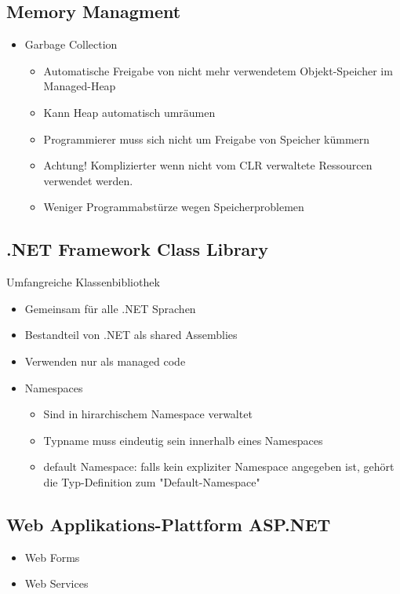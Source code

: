\subsection{Memory Managment}
\begin{itemize}
	\item Garbage Collection
		\begin{itemize}
			\item Automatische Freigabe von nicht mehr verwendetem Objekt-Speicher im Managed-Heap
			\item Kann Heap automatisch umräumen
			\item Programmierer muss sich nicht um Freigabe von Speicher kümmern
			\item Achtung! Komplizierter wenn nicht vom CLR verwaltete Ressourcen verwendet werden.
			\item Weniger Programmabstürze wegen Speicherproblemen
		\end{itemize}
\end{itemize}

\subsection{.NET Framework Class Library}
Umfangreiche Klassenbibliothek
\begin{itemize}
	\item Gemeinsam für alle .NET Sprachen
	\item Bestandteil von .NET als shared Assemblies
	\item Verwenden nur als managed code
	\item Namespaces
	\begin{itemize}
  	\item Sind in hirarchischem Namespace verwaltet	
  	\item Typname muss eindeutig sein innerhalb eines Namespaces
  	\item default Namespace: falls kein expliziter Namespace angegeben ist,
  	      gehört die Typ-Definition zum "Default-Namespace"
	\end{itemize}
\end{itemize}

\subsection{Web Applikations-Plattform ASP.NET}
\begin{itemize}
	\item Web Forms
	\item Web Services
\end{itemize}
